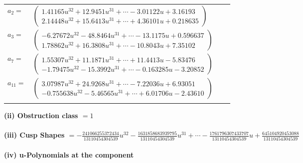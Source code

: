 \documentclass[1p]{elsarticle_modified}
\theoremstyle{definition}
\begin{document}
\begin{tabular}{m{7pt} m{180pt} m{7pt} m{180pt} }
\flushright $a_{2}=$&$\begin{pmatrix}1.41165 u^{32}+12.9451 u^{31}+\cdots-3.01122 u+3.16193\\2.14448 u^{32}+15.6413 u^{31}+\cdots+4.36101 u+0.218635\end{pmatrix}$ \\
\flushright $a_{3}=$&$\begin{pmatrix}-6.27672 u^{32}-48.8464 u^{31}+\cdots-13.1175 u+0.596637\\1.78862 u^{32}+16.3808 u^{31}+\cdots-10.8043 u+7.35102\end{pmatrix}$ \\
\flushright $a_{7}=$&$\begin{pmatrix}1.55307 u^{32}+11.1871 u^{31}+\cdots+11.4413 u-5.83476\\-1.79475 u^{32}-15.3992 u^{31}+\cdots-0.163285 u-3.20852\end{pmatrix}$ \\
\flushright $a_{11}=$&$\begin{pmatrix}3.07987 u^{32}+24.9268 u^{31}+\cdots-7.22036 u+6.93051\\-0.755638 u^{32}-5.46565 u^{31}+\cdots+6.01706 u-2.43610\end{pmatrix}$\\&\end{tabular}
\flushleft \textbf{(ii) Obstruction class $= 1$}\\~\\
\flushleft \textbf{(iii) Cusp Shapes $= -\frac{241066255372434}{13110454304539} u^{32}-\frac{1631858683939795}{13110454304539} u^{31}+\cdots-\frac{1761796307433707}{13110454304539} u+\frac{645104920453088}{13110454304539}$}\\~\\
\newpage\renewcommand{\arraystretch}{1}
\flushleft \textbf{(iv) u-Polynomials at the component}\newline \\
\end{document}
